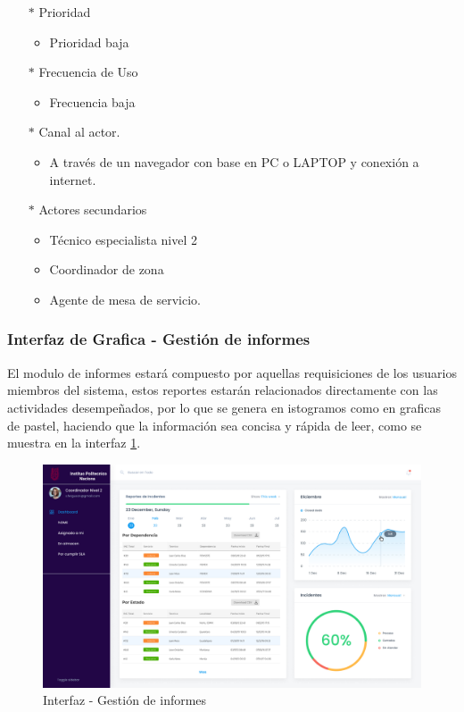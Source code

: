 \begin{multicols}{2}
\begin{itemize}
			\item[$*$]  Prioridad 
		\begin{itemize}
			\item Prioridad baja 
		\end{itemize}
		\item[$*$]  Frecuencia de Uso
		\begin{itemize}
			\item Frecuencia baja
		\end{itemize}
		\item[$*$]   Canal al actor.
		\begin{itemize}
			\item 	A través de un navegador con base en PC o LAPTOP y conexión a internet.
		\end{itemize}
		\item[$*$]  Actores secundarios
		\begin{itemize}
			\item Técnico especialista nivel 2
			\item Coordinador de zona
			\item Agente de mesa de servicio.
		\end{itemize}
\end{itemize}

\end{multicols}


\subsubsection{Interfaz de Grafica - Gestión de informes}





El modulo de informes estará compuesto por aquellas requisiciones  de los usuarios miembros del sistema, estos reportes estarán relacionados directamente con las actividades desempeñados, por lo que se genera en istogramos como en graficas de pastel, haciendo que la información sea concisa y rápida de leer, como se muestra en la interfaz  \ref{fig:GDINFOE}.


\begin{figure}[h]
	\centering
	\includegraphics[width=1.1\textwidth]{Capitulo4/Img/GestionInf/informes}
	\caption{Interfaz - Gestión de informes}
	\label{fig:GDINFOE}
\end{figure}



